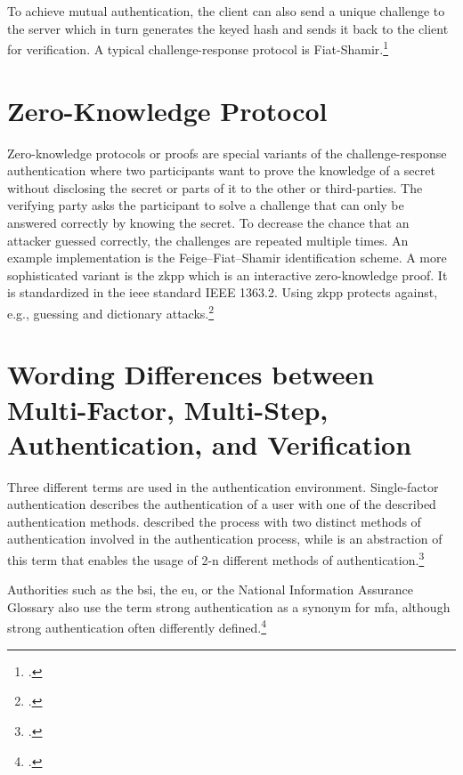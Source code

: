 To achieve mutual authentication, the client can also send a unique challenge to the server which in turn generates the keyed hash and sends it back to the client for verification. A typical challenge-response protocol is Fiat-Shamir.\footcites[See][Chapter 13.6]{waschke2017personal}[See][489--491]{eckert-it-sec-9}

\section{Zero-Knowledge Protocol}

Zero-knowledge protocols or proofs are special variants of the challenge-response authentication where two participants want to prove the knowledge of a secret without disclosing the secret or parts of it to the other or third-parties. The verifying party asks the participant to solve a challenge that can only be answered correctly by knowing the secret. To decrease the chance that an attacker guessed correctly, the challenges are repeated multiple times. An example implementation is the Feige–Fiat–Shamir identification scheme. A more sophisticated variant is the \gls{zkpp} which is an interactive zero-knowledge proof. It is standardized in the \gls{ieee} standard IEEE 1363.2. Using \gls{zkpp} protects against, e.g., guessing and dictionary attacks.\footcites[See][492]{eckert-it-sec-9}[See][Chapter 28.3.7]{1174011}[See][769--770]{FISCHERHBNER2017759}[See][]{Feige1988}

\section{Wording Differences between Multi-Factor, Multi-Step, Authentication, and Verification}

Three different terms are used in the authentication environment. Single-factor authentication describes the authentication of a user with one of the described authentication methods.  described the process with two distinct methods of authentication involved in the authentication process, while  is an abstraction of this term that enables the usage of 2-n different methods of authentication.\footcites[See][186--188]{dasgupta2017multi}

Authorities such as the \gls{bsi}, the \gls{eu}, or the National Information Assurance Glossary also use the term \frqq strong authentication\flqq{} as a synonym for \gls{mfa}, although strong authentication often differently defined.\footcites[See][47]{CNSS4009}[See][11]{deutschland2018grundschutz}

